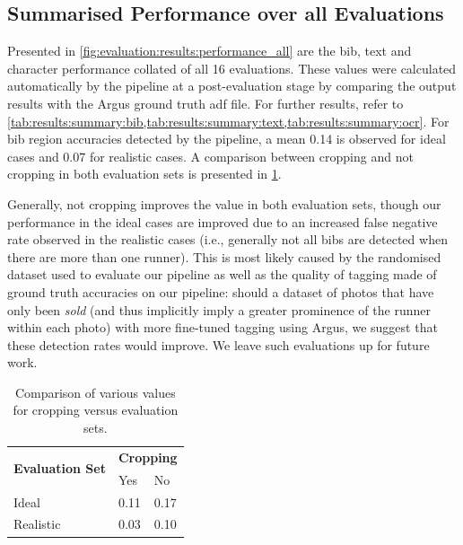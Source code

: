 \subsection{Summarised Performance over all Evaluations}
\label{sec:evaluation:results}

Presented in \cref{fig:evaluation:results:performance_all} are the bib, text and character performance collated of all 16 evaluations. These values were calculated automatically by the pipeline at a post-evaluation stage by comparing the output results with the Argus ground truth \gls{adf} file. For further results, refer to \cref{tab:results:summary:bib,tab:results:summary:text,tab:results:summary:ocr}. For bib region accuracies detected by the pipeline, a mean \fscore{} 0.14 is observed for ideal cases and 0.07 for realistic cases. A comparison between cropping and not cropping in both evaluation sets is presented in \cref{tab:evaluation:fscore_comparison}.

Generally, not cropping improves the \fscore{} value in both evaluation sets, though our performance in the ideal cases are improved due to an increased false negative rate observed in the realistic cases (i.e., generally not all bibs are detected when there are more than one runner). This is most likely caused by the randomised dataset used to evaluate our pipeline as well as the quality of tagging made of ground truth accuracies on our pipeline: should a dataset of photos that have only been \textit{sold} (and thus implicitly imply a greater prominence of the runner within each photo) with more fine-tuned tagging using Argus, we suggest that these detection rates would improve. We leave such evaluations up for future work.

\begin{table}[h]
\centering
\caption{Comparison of various \fscore{} values for cropping versus evaluation sets.}
\label{tab:evaluation:fscore_comparison}
\begin{tabular}{lll}
\hline
\multicolumn{1}{c}{\multirow{2}{*}{\textbf{Evaluation Set}}} & \multicolumn{2}{c}{\textbf{Cropping}} \\ \cline{2-3} 
\multicolumn{1}{c}{}                                         & Yes                & No               \\ \hline
Ideal                                                        & 0.11               & 0.17             \\ 
Realistic                                                    & 0.03               & 0.10             \\ \hline
\end{tabular}
\end{table}

